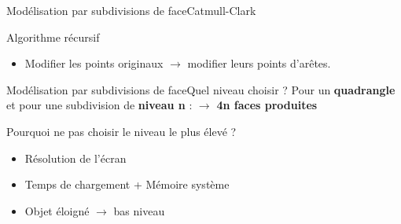 \documentclass{beamer}
\begin{document}
\begin{frame}[c]{Modélisation par subdivisions de face}{Catmull-Clark}
\begin{minipage}[b]{0.88\linewidth}
\begin{block}{Algorithme récursif}
\begin{itemize}
    \item <8->Modifier les points originaux $\rightarrow$ modifier leurs points d'arêtes.
    
    \end{itemize}
\end{block}

\end{minipage} 

\end{frame}
\begin{frame}[c]{Modélisation par subdivisions de face}{Quel niveau choisir ?}
Pour un \textbf{quadrangle} et pour une subdivision de \textbf{niveau n} : 
\newline $\rightarrow$ \textbf{4n faces produites}
\newline
\begin{block}{Pourquoi ne pas choisir le niveau le plus élevé ?}
\begin{itemize}
\item{Résolution de l’écran}
\item{Temps de chargement + Mémoire système}
\item{Objet éloigné $\rightarrow$ bas niveau}
\end{itemize}
\end{block}
\end{frame}

\end{document}
